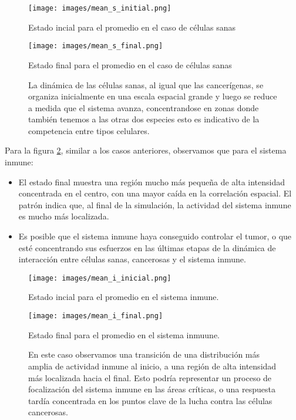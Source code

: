 \documentclass{article}
\begin{document}
\begin{figure}[ht]
    \centering
    \begin{minipage}[b]{0.45\textwidth}
        \centering
        \texttt{[image: images/mean\_s\_initial.png]}
        \caption{Estado incial para el promedio en el caso de células sanas}
        \label{fig:fft_initial_s}
    \end{minipage}
    \hfill
    \begin{minipage}[b]{0.45\textwidth}
        \centering
        \texttt{[image: images/mean\_s\_final.png]}
        \caption{Estado final para el promedio en el caso de células sanas}
        \label{fig:fft_final_s}
    \end{minipage}
    \caption{La dinámica de las células sanas, al igual que las cancerígenas, se organiza inicialmente en una escala espacial grande y luego se reduce a medida que el sistema avanza, concentrandose en zonas donde también tenemos a las otras dos especies esto es indicativo de la competencia entre tipos celulares.}
    \label{fig:imagen_espectros_s}
\end{figure}

Para la figura \ref{fig:imagen_espectros_i}, similar a los casos anteriores, observamos que para el sistema inmune:


\begin{itemize}
    \item El estado final muestra una región mucho más pequeña de alta intensidad concentrada en el centro, con una mayor caída en la correlación espacial. El patrón indica que, al final de la simulación, la actividad del sistema inmune es mucho más localizada.
    
    \item Es posible que el sistema inmune haya conseguido controlar el tumor, o que esté concentrando sus esfuerzos en las últimas etapas de la dinámica de interacción entre células sanas, cancerosas y el sistema inmune.
\end{itemize}


\begin{figure}[ht]
    \centering
    \begin{minipage}[b]{0.45\textwidth}
        \centering
        \texttt{[image: images/mean\_i\_inicial.png]}
        \caption{Estado incial para el promedio en el sistema inmune.}
        \label{fig:fft_initial_i}
    \end{minipage}
    \hfill
    \begin{minipage}[b]{0.45\textwidth}
        \centering
        \texttt{[image: images/mean\_i\_final.png]}
        \caption{Estado final para el promedio en el sistema inmuune.}
        \label{fig:fft_final_i}
    \end{minipage}
    \caption{En este caso observamos una transición de una distribución más amplia de actividad inmune al inicio, a una región de alta intensidad más localizada hacia el final. Esto podría representar un proceso de focalización del sistema inmune en las áreas críticas, o una respuesta tardía concentrada en los puntos clave de la lucha contra las células cancerosas.}
    \label{fig:imagen_espectros_i}
\end{figure}
\end{document}
